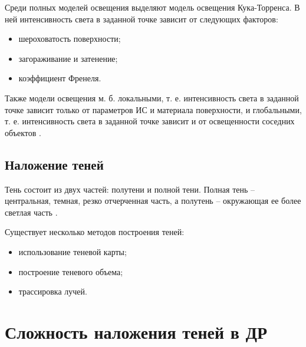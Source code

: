 Среди полных моделей освещения выделяют модель освещения Кука-Торренса. В ней интенсивность света в заданной точке зависит от следующих факторов:

\begin{itemize}
	\item шероховатость поверхности;
	\item загораживание и затенение;
	\item коэффициент Френеля.
\end{itemize}

Также модели освещения м. б. локальными, т. е. интенсивность света в заданной точке зависит только от параметров ИС и материала поверхности, и глобальными, т. е. интенсивность света в заданной точке зависит и от освещенности соседних объектов \cite{rogers}.

\subsection{Наложение теней}

Тень состоит из двух частей: полутени и полной тени. Полная тень -- центральная, темная, резко отчерченная часть, а полутень -- окружающая ее более светлая часть \cite{rogers}.

Существует несколько методов построения теней:

\begin{itemize}
	\item использование теневой карты;
	\item построение теневого объема;
	\item трассировка лучей.
\end{itemize}



\section{Сложность наложения теней в ДР}

